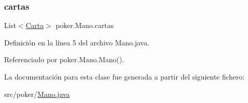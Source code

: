 \subsubsection{\texorpdfstring{cartas}{cartas}}
{\footnotesize\ttfamily List$<$\mbox{\hyperlink{classpoker_1_1Carta}{Carta}}$>$ poker.\+Mano.\+cartas\hspace{0.3cm}{\ttfamily [private]}}



Definición en la línea 5 del archivo Mano.\+java.



Referenciado por poker.\+Mano.\+Mano().



La documentación para esta clase fue generada a partir del siguiente fichero\+:\begin{DoxyCompactItemize}
\item 
src/poker/\mbox{\hyperlink{Mano_8java}{Mano.\+java}}\end{DoxyCompactItemize}
